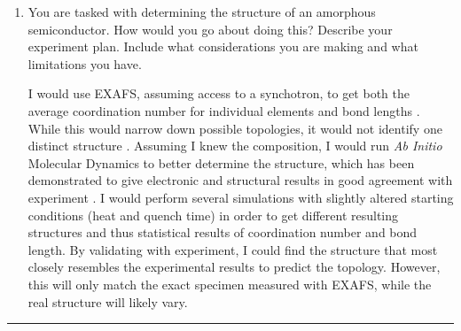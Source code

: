 \documentclass[12pt]{elsarticle}
\newcommand{\vs}{\vspace{2mm}}
\newcommand{\fullline}{\noindent\rule{14cm}{0.4pt} \vspace{4mm}}
\begin{document}
\begin{enumerate}
\fullline
\item You are tasked with determining the structure of an amorphous semiconductor. How would you go about doing this? Describe your experiment plan. Include what considerations you are making and what limitations you have.
\par \vs 
 I would use EXAFS, assuming access to a synchotron, to get both the average coordination number for individual elements and bond lengths \cite{Baker2006,Paesler2007}. While this would narrow down possible topologies, it would not identify one distinct structure \cite{Zallen1983}. Assuming I knew the composition, I would run \emph{Ab Initio} Molecular Dynamics to better determine the structure, which has been demonstrated to give electronic and structural results in good agreement with experiment \cite{Ispas2001,Chakraborty2017,Zhang2014}. I would perform several simulations with slightly altered starting conditions (heat and quench time) in order to get different resulting structures and thus statistical results of coordination number and bond length. By validating with experiment, I could find the structure that most closely resembles the experimental results to predict the topology. However, this will only match the exact specimen measured with EXAFS, while the real structure will likely vary. 
 


\end{enumerate}

\fullline
\end{document}
